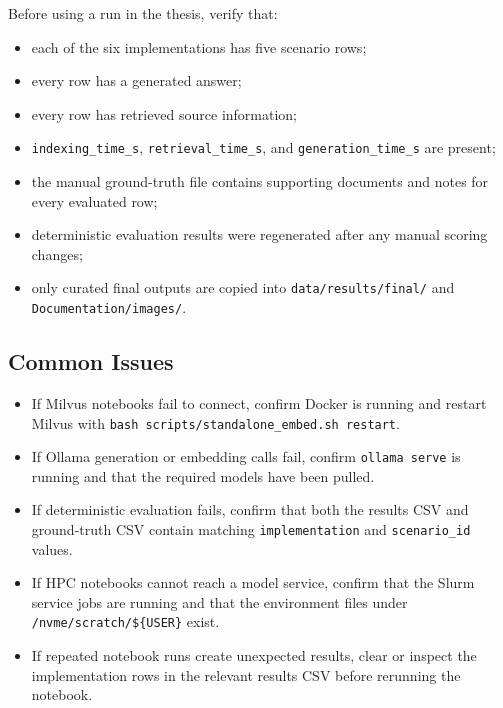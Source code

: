 Before using a run in the thesis, verify that:

\begin{itemize}
    \item each of the six implementations has five scenario rows;
    \item every row has a generated answer;
    \item every row has retrieved source information;
    \item \texttt{indexing\_time\_s}, \texttt{retrieval\_time\_s}, and \texttt{generation\_time\_s} are present;
    \item the manual ground-truth file contains supporting documents and notes for every evaluated row;
    \item deterministic evaluation results were regenerated after any manual scoring changes;
    \item only curated final outputs are copied into \texttt{data/results/final/} and \texttt{Documentation/images/}.
\end{itemize}

\subsection*{Common Issues}

\begin{itemize}
    \item If Milvus notebooks fail to connect, confirm Docker is running and restart Milvus with \texttt{bash scripts/standalone\_embed.sh restart}.
    \item If Ollama generation or embedding calls fail, confirm \texttt{ollama serve} is running and that the required models have been pulled.
    \item If deterministic evaluation fails, confirm that both the results CSV and ground-truth CSV contain matching \texttt{implementation} and \texttt{scenario\_id} values.
    \item If \ac{HPC} notebooks cannot reach a model service, confirm that the Slurm service jobs are running and that the environment files under \texttt{/nvme/scratch/\$\{USER\}} exist.
    \item If repeated notebook runs create unexpected results, clear or inspect the implementation rows in the relevant results CSV before rerunning the notebook.
\end{itemize}
